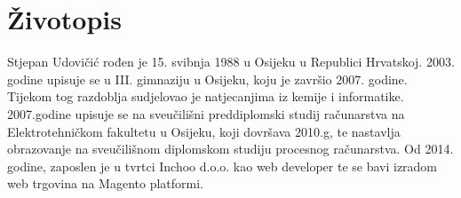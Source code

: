 \section*{Životopis}

Stjepan Udovičić rođen je 15. svibnja 1988 u Osijeku u Republici Hrvatskoj. 2003. godine upisuje se u III. gimnaziju u Osijeku, koju je završio 2007. godine. Tijekom tog razdoblja sudjelovao je natjecanjima iz kemije i informatike. 2007.godine upisuje se na sveučilišni preddiplomski studij računarstva na Elektrotehničkom fakultetu u Osijeku, koji dovršava 2010.g, te nastavlja obrazovanje na sveučilišnom diplomskom studiju procesnog računarstva. Od 2014. godine, zaposlen je u tvrtci Inchoo d.o.o. kao web developer te se bavi izradom web trgovina na Magento platformi.